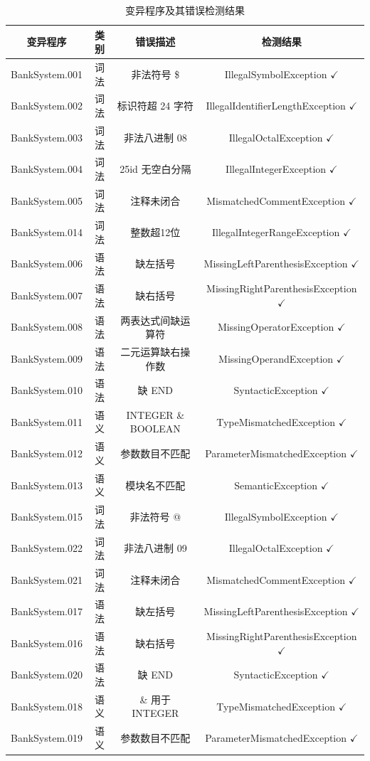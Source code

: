 \begin{table}[htbp]
    \centering
    \begin{tabular}{|c|c|c|c|}
    \hline
    \textbf{变异程序} & \textbf{类别} & \textbf{错误描述} & \textbf{检测结果} \\
    \hline
    BankSystem.001 & 词法 & 非法符号 \$ & IllegalSymbolException $\checkmark$ \\
    BankSystem.002 & 词法 & 标识符超 24 字符 & IllegalIdentifierLengthException $\checkmark$ \\
    BankSystem.003 & 词法 & 非法八进制 08 & IllegalOctalException $\checkmark$ \\
    BankSystem.004 & 词法 & 25id 无空白分隔 & IllegalIntegerException $\checkmark$ \\
    BankSystem.005 & 词法 & 注释未闭合 & MismatchedCommentException $\checkmark$ \\
    BankSystem.014 & 词法 & 整数超12位 & IllegalIntegerRangeException $\checkmark$ \\
    BankSystem.006 & 语法 & 缺左括号 & MissingLeftParenthesisException $\checkmark$ \\
    BankSystem.007 & 语法 & 缺右括号 & MissingRightParenthesisException $\checkmark$ \\
    BankSystem.008 & 语法 & 两表达式间缺运算符 & MissingOperatorException $\checkmark$ \\
    BankSystem.009 & 语法 & 二元运算缺右操作数 & MissingOperandException $\checkmark$ \\
    BankSystem.010 & 语法 & 缺 END & SyntacticException $\checkmark$ \\
    BankSystem.011 & 语义 & INTEGER \& BOOLEAN & TypeMismatchedException $\checkmark$ \\
    BankSystem.012 & 语义 & 参数数目不匹配 & ParameterMismatchedException $\checkmark$ \\
    BankSystem.013 & 语义 & 模块名不匹配 & SemanticException $\checkmark$ \\
    BankSystem.015 & 词法 & 非法符号 @ & IllegalSymbolException $\checkmark$ \\
    BankSystem.022 & 词法 & 非法八进制 09 & IllegalOctalException $\checkmark$ \\
    BankSystem.021 & 词法 & 注释未闭合 & MismatchedCommentException $\checkmark$ \\
    BankSystem.017 & 语法 & 缺左括号 & MissingLeftParenthesisException $\checkmark$ \\
    BankSystem.016 & 语法 & 缺右括号 & MissingRightParenthesisException $\checkmark$ \\
    BankSystem.020 & 语法 & 缺 END & SyntacticException $\checkmark$ \\
    BankSystem.018 & 语义 & \& 用于 INTEGER & TypeMismatchedException $\checkmark$ \\
    BankSystem.019 & 语义 & 参数数目不匹配 & ParameterMismatchedException $\checkmark$ \\
    \hline
    \end{tabular}
    \caption{变异程序及其错误检测结果}
    \label{tab:mutants}
\end{table}

